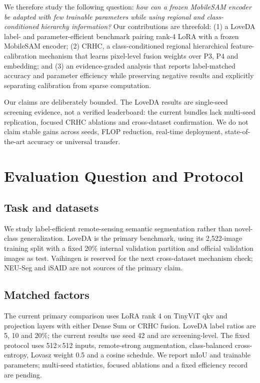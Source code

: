 \documentclass[10pt,twocolumn]{article}
\begin{document}
We therefore study the following question: \emph{how can a frozen MobileSAM encoder be adapted with few trainable parameters while using regional and class-conditioned hierarchy information?} Our contributions are threefold: (1) a LoveDA label- and parameter-efficient benchmark pairing rank-4 LoRA with a frozen MobileSAM encoder; (2) CRHC, a class-conditioned regional hierarchical feature-calibration mechanism that learns pixel-level fusion weights over P3, P4 and embedding; and (3) an evidence-graded analysis that reports label-matched accuracy and parameter efficiency while preserving negative results and explicitly separating calibration from sparse computation.

Our claims are deliberately bounded. The LoveDA results are single-seed screening evidence, not a verified leaderboard: the current bundles lack multi-seed replication, focused CRHC ablations and cross-dataset confirmation. We do not claim stable gains across seeds, FLOP reduction, real-time deployment, state-of-the-art accuracy or universal transfer.

\section{Evaluation Question and Protocol}
\subsection{Task and datasets}
We study label-efficient remote-sensing semantic segmentation rather than novel-class generalization. LoveDA is the primary benchmark, using its 2,522-image training split with a fixed 20\% internal validation partition and official validation images as test. Vaihingen is reserved for the next cross-dataset mechanism check; NEU-Seg and iSAID are not sources of the primary claim.

\subsection{Matched factors}
The current primary comparison uses LoRA rank 4 on TinyViT qkv and projection layers with either Dense Sum or CRHC fusion. LoveDA label ratios are 5, 10 and 20\%; the current results use seed 42 and are screening-level. The fixed protocol uses 512$\times$512 inputs, remote-strong augmentation, class-balanced cross-entropy, Lovasz weight 0.5 and a cosine schedule. We report mIoU and trainable parameters; multi-seed statistics, focused ablations and a fixed efficiency record are pending.
\end{document}
